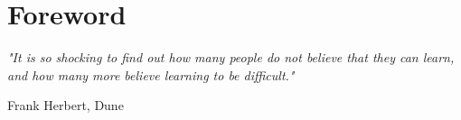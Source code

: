 \chapter*{Foreword}
\Large
\textit{"It is so shocking to find out how many people do not believe that they can learn, and how many more believe learning to be difficult."}
\begin{flushright}
Frank Herbert, Dune
\end{flushright}
\normalsize


